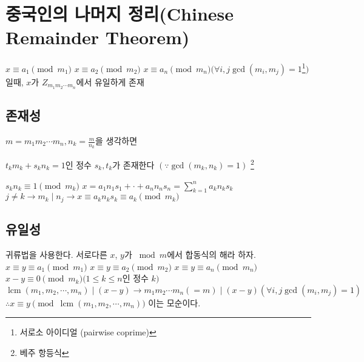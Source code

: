 

\section{중국인의 나머지 정리(Chinese Remainder Theorem)}


$x \equiv a_1 \pmod{m_1}$
$x \equiv a_2 \pmod{m_2}$
$x \equiv a_n \pmod{m_n} ( \forall i,j \gcd(m_{i} ,m_{j}) = 1$\footnote{서로소 아이디얼 (pairwise coprime)}$)$
일때, $x$가 $ Z_{m_{1}m_{2} \cdots m_{n}}$에서 유일하게 존재

\subsection{존재성}
$m = m_{1}m_{2} \cdots m_{n}, n_{k} = \frac{m}{n_k}$을 생각하면 

$t_{k}m_{k} + s_{k}n_{k} = 1$인 정수 $s_{k}, t_{k}$가 존재한다 $( \because \gcd( m_{k}, n_{k}) = 1 )$ 
\footnote{베주 항등식}

$s_{k}n_{k} \equiv 1 \pmod{m_k}$
$x=a_{1}n_{1}s_{1} + \cdot + a_{n}n_{n}s_{n} = \sum_{k=1}^n a_{k}n_{k}s_{k}$
$j \ne k \longrightarrow m_{k} \mid n_{j} \longrightarrow x \equiv a_{k}n_{k}s_{k} \equiv a_{k} \pmod{m_{k}}$

\subsection{유일성}
귀류법을 사용한다.
서로다른 $x$, $y$가 $\bmod m$에서 합동식의 해라 하자.
$x \equiv y\equiv a_1 \pmod{m_1}$
$x \equiv y\equiv a_2 \pmod{m_2}$
$x \equiv y\equiv a_n \pmod{m_n}$
$x - y \equiv 0 \pmod{m_k} ( 1\le k \le n$인 정수 $k )$
$\operatorname{lcm}(m_1, m_2, \cdots, m_n) \mid (x-y) \longrightarrow m_{1} m_{2} \cdots m_{n}( = m ) \mid (x-y) (\forall i,j \gcd(m_{i} ,m_{j}) = 1)$
$\therefore x \equiv y \pmod{\operatorname{lcm}(m_1, m_2, \cdots, m_n)}$
이는 모순이다.
